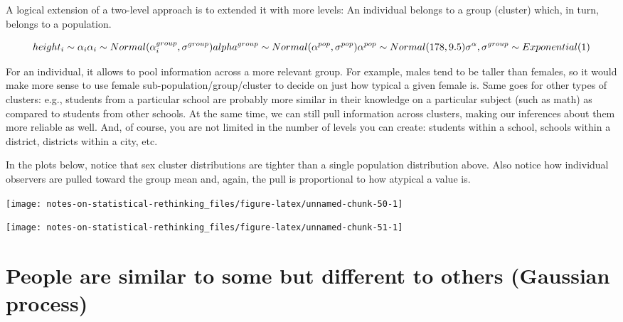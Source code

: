 \documentclass[
]{book}
\begin{document}
A logical extension of a two-level approach is to extended it with more levels: An individual belongs to a group (cluster) which, in turn, belongs to a population.

\[height_i \sim \alpha_i\\
\alpha_i \sim Normal(\alpha^{group}_i, \sigma^{group})\\
alpha^{group} \sim Normal(\alpha^{pop}, \sigma^{pop}) \\
\alpha^{pop} \sim Normal(178, 9.5)\\
\sigma^{\alpha}, \sigma^{group} \sim Exponential(1)\]

For an individual, it allows to pool information across a more relevant group. For example, males tend to be taller than females, so it would make more sense to use female sub-population/group/cluster to decide on just how typical a given female is. Same goes for other types of clusters: e.g., students from a particular school are probably more similar in their knowledge on a particular subject (such as math) as compared to students from other schools. At the same time, we can still pull information across clusters, making our inferences about them more reliable as well. And, of course, you are not limited in the number of levels you can create: students within a school, schools within a district, districts within a city, etc.

In the plots below, notice that sex cluster distributions are tighter than a single population distribution above. Also notice how individual observers are pulled toward the group mean and, again, the pull is proportional to how atypical a value is.

\begin{center}\texttt{[image: notes-on-statistical-rethinking\_files/figure-latex/unnamed-chunk-50-1]} \end{center}

\begin{center}\texttt{[image: notes-on-statistical-rethinking\_files/figure-latex/unnamed-chunk-51-1]} \end{center}

\hypertarget{people-are-similar-to-some-but-different-to-others-gaussian-process}{%
\section{People are similar to some but different to others (Gaussian process)}\label{people-are-similar-to-some-but-different-to-others-gaussian-process}}
\end{document}
